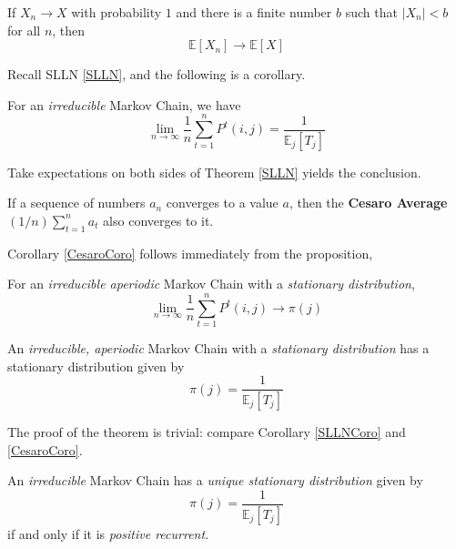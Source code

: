 \begin{lemma}\label{BCT}
    If $X_n \to X$ with probability $1$ and there is a finite number $b$ such that $|X_n| < b$ for all $n$, then
    \[ \mathbb{E}[X_n] \to \mathbb{E}[X] \]
\end{lemma}

Recall SLLN \ref{SLLN}, and the following is a corollary.
\begin{corollary}\label{SLLNCoro}
    For an \emph{irreducible} Markov Chain, we have
    \[ \lim_{n\to\infty} \frac{1}{n}\sum_{t=1}^n P^t(i,j) = \frac{1}{\mathbb{E}_j[T_j]} \]
\end{corollary}
\begin{sketchproof}
    Take expectations on both sides of Theorem \ref{SLLN} yields the conclusion.
\end{sketchproof}

\begin{proposition}
    If a sequence of numbers $a_n$ converges to a value $a$, then the \textbf{Cesaro Average} $(1/n)\sum_{t=1}^na_t$ also converges to it.
\end{proposition}
Corollary \ref{CesaroCoro} follows immediately from the proposition,
\begin{corollary}\label{CesaroCoro}
    For an \emph{irreducible aperiodic} Markov Chain with a \emph{stationary distribution},
    \[ \lim_{n\to\infty}\frac{1}{n}\sum_{t=1}^nP^t(i,j) \to \pi(j) \]
\end{corollary}
\begin{theorem}
    An \emph{irreducible, aperiodic} Markov Chain with a \emph{stationary distribution} has a stationary distribution given by
    \[ \pi(j) = \frac{1}{\mathbb{E}_j[T_j]} \]
\end{theorem}
\begin{sketchproof}
    The proof of the theorem is trivial: compare Corollary \ref{SLLNCoro} and \ref{CesaroCoro}.
\end{sketchproof}

\begin{theorem}
    An \emph{irreducible} Markov Chain has a \emph{unique stationary distribution} given by
    \[ \pi(j) = \frac{1}{\mathbb{E}_j[T_j]} \]
    if and only if it is \emph{positive recurrent}.
\end{theorem}

